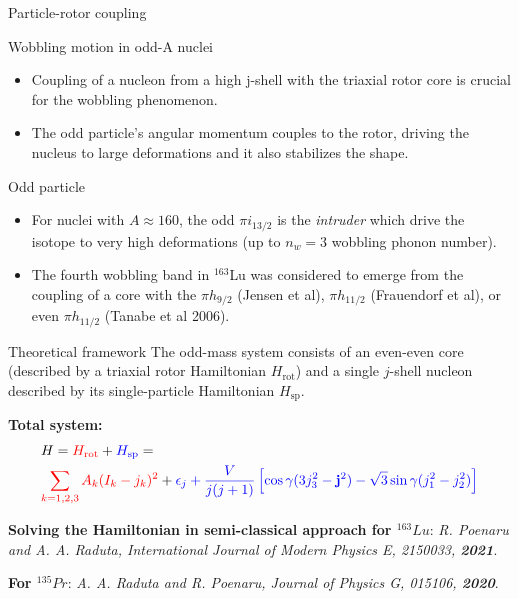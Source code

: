 \documentclass{beamer}
\begin{document}
\begin{frame}{Particle-rotor coupling}
  \begin{block}{Wobbling motion in odd-A nuclei}  
    \begin{itemize}
      \item Coupling of a nucleon from a high j-shell with the triaxial rotor core is crucial for the wobbling phenomenon.
      \item The odd particle’s angular momentum couples to the rotor, driving the nucleus to large deformations and it also stabilizes the shape.
    \end{itemize}
  \end{block}
  \begin{exampleblock}{Odd particle}
  \begin{itemize}
      \item For nuclei with $A\approx160$, the odd $\pi i_{13/2}$ is the \emph{intruder} which drive the isotope to very high deformations (up to $n_w=3$ wobbling phonon number).
      \item The fourth wobbling band in $^{163}$Lu was considered to emerge from the coupling of a core with the $\pi h_{9/2}$ (Jensen et al), $\pi h_{11/2}$ (Frauendorf et al), or even $\pi h_{11/2}$ (Tanabe et al 2006).
  \end{itemize}
  \end{exampleblock}
\end{frame}

\begin{frame}{Theoretical framework}
  The odd-mass system consists of an {\color{red}even-even core} (described by a triaxial rotor Hamiltonian {\color{red}$H_\text{rot}$}) and a single {\color{blue}$j$-shell nucleon} described by its single-particle Hamiltonian {\color{blue}$H_\text{sp}$}.
  \par \textbf{Total system:}
  \begin{align}
    &H={\color{red}H_\text{rot}}+{\color{blue}H_\text{sp}}=\\
&{\color{red}\sum_{k=1,2,3}A_k(I_k-j_k)^2}+{\color{blue}\epsilon_j+\frac{V}{j(j+1)}\left[\cos\gamma(3j_3^2-\mathbf{j}^2)-\sqrt{3}\sin\gamma(j_1^2-j_2^2)\right]}
  \end{align}
  \par {\footnotesize \textbf{Solving the Hamiltonian in semi-classical approach for $^{163}Lu$}: \textit{R. Poenaru and A. A. Raduta, International Journal of Modern Physics E, 2150033, \textbf{2021}}.}
  \par {\footnotesize \textbf{For $^{135}Pr$}: \textit{A. A. Raduta and R. Poenaru, Journal of Physics G, 015106, \textbf{2020}}.}
\end{frame}
\end{document}
